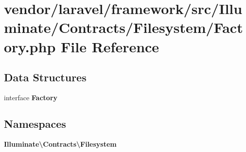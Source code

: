 \section{vendor/laravel/framework/src/\+Illuminate/\+Contracts/\+Filesystem/\+Factory.php File Reference}
\label{laravel_2framework_2src_2_illuminate_2_contracts_2_filesystem_2_factory_8php}
\subsection*{Data Structures}
\begin{DoxyCompactItemize}
\item 
interface {\bf Factory}
\end{DoxyCompactItemize}
\subsection*{Namespaces}
\begin{DoxyCompactItemize}
\item 
 {\bf Illuminate\textbackslash{}\+Contracts\textbackslash{}\+Filesystem}
\end{DoxyCompactItemize}
